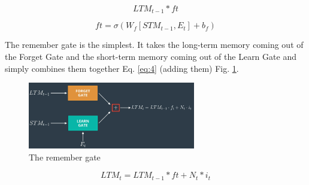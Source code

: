 \documentclass{article}
\begin{document}
\begin{equation}
LTM_{t-1} * ft
\label{eq:2}
\end{equation}


\begin{equation}
ft = \sigma(W_f[ST M_{t-1}, E_t] + b_f)
\label{eq:3}
\end{equation}

The remember gate is the simplest. It takes the long-term memory coming out of the Forget Gate and the short-term memory coming out of the Learn Gate and simply combines them together Eq. \eqref{eq:4} (adding them) Fig. \ref{fig:f12}.


\begin{figure}[ht]
    \centering
    \includegraphics[width=0.65\textwidth,height=0.65\textheight,keepaspectratio]{images/remember_gate.png}
    \captionsetup{justification=centering}
    \caption{The remember gate}
    \label{fig:f12}
\end{figure}

\begin{equation}
LTM_t = LTM_{t-1} * ft + N_t * i_t
\label{eq:4}
\end{equation}

\printbibliography
\end{document}
